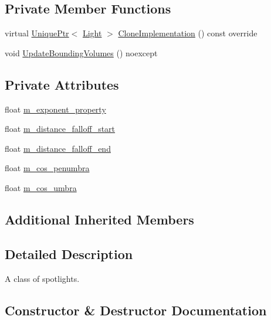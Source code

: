 \subsection*{Private Member Functions}
\begin{DoxyCompactItemize}
\item 
virtual \hyperlink{namespacemage_a3316d7143a973e37adf1110f2e80ca31}{Unique\+Ptr}$<$ \hyperlink{classmage_1_1_light}{Light} $>$ \hyperlink{classmage_1_1_spot_light_a060044ae1de97143878ad26524f03709}{Clone\+Implementation} () const override
\item 
void \hyperlink{classmage_1_1_spot_light_a83035abee0050acdca47b1f95b30a793}{Update\+Bounding\+Volumes} () noexcept
\end{DoxyCompactItemize}
\subsection*{Private Attributes}
\begin{DoxyCompactItemize}
\item 
float \hyperlink{classmage_1_1_spot_light_ac1ac3c8c25760d8beb7e05c8caeaa6a3}{m\+\_\+exponent\+\_\+property}
\item 
float \hyperlink{classmage_1_1_spot_light_a96c4a4f1b77c9a6aadb82cf48248cc5d}{m\+\_\+distance\+\_\+falloff\+\_\+start}
\item 
float \hyperlink{classmage_1_1_spot_light_a8e0616e3a36d1a05d800cc4a43739178}{m\+\_\+distance\+\_\+falloff\+\_\+end}
\item 
float \hyperlink{classmage_1_1_spot_light_ac5d9f3426397abff72c5098b6e7e8472}{m\+\_\+cos\+\_\+penumbra}
\item 
float \hyperlink{classmage_1_1_spot_light_a9afab31514f93d702f9e516491f262f2}{m\+\_\+cos\+\_\+umbra}
\end{DoxyCompactItemize}
\subsection*{Additional Inherited Members}


\subsection{Detailed Description}
A class of spotlights. 

\subsection{Constructor \& Destructor Documentation}
\hypertarget{classmage_1_1_spot_light_adc5c7b5fead1b7b0c8728ffd816a9ada}{}\label{classmage_1_1_spot_light_adc5c7b5fead1b7b0c8728ffd816a9ada} 
